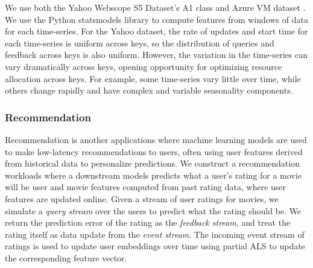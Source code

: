 We use both the Yahoo Webscope S5 Dataset's A1 class \cite{laptev2015yahoo} and Azure VM dataset \cite{cortez2017resource}. We use the Python statsmodels library \cite{seabold2010statsmodels} to compute features from windows of data for each time-series. For the Yahoo dataset, the rate of updates and start time for each time-series is uniform across keys, so the distribution of queries and feedback across keys is also uniform. However, the variation in the time-series can vary dramatically across keys, opening opportunity for optimizing resource allocation across keys. For example, some time-series vary little over time, while others change rapidly and have complex and variable seasonality components. 






\subsubsection{Recommendation}

Recommendation is another applications where machine learning models are used to make low-latency recommendations to users, often using user features derived from historical data to personalize predictions. We construct a recommendation workloads where a downstream models predicts what a user's rating for a movie will be user and movie features computed from past rating data, where user features are updated online. Given a stream of user ratings for movies, we simulate a \textit{query stream} over the users to predict what the rating should be. We return the prediction error of the rating as the \textit{feedback stream}, and treat the rating itself as data update from the \textit{event stream}. The incoming event stream of ratings is used to update user embeddings over time using partial ALS to update the corresponding feature vector. 

